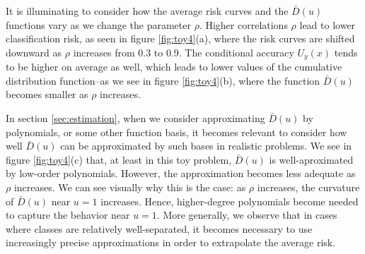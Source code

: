 \documentclass[12pt]{article}
\begin{document}
It is illuminating to consider how the average risk curves and the
$\bar{D}(u)$ functions vary as we change the parameter $\rho$.  Higher
correlations $\rho$ lead to lower classification risk, as seen in
figure \ref{fig:toy4}(a), where the risk curves are shifted downward as
$\rho$ increases from 0.3 to 0.9.  The conditional accuracy $U_y(x)$
tends to be higher on average as well, which leads to lower values of
the cumulative distribution function--as we see in
figure \ref{fig:toy4}(b), where the function $\bar{D}(u)$ becomes smaller
as $\rho$ increases.

In section \ref{sec:estimation}, when we consider approximating
$\bar{D}(u)$ by polynomials, or some other function basis, it becomes
relevant to consider how well $\bar{D}(u)$ can be approximated by such
bases in realistic problems.  We see in figure \ref{fig:toy4}(c) that,
at least in this toy problem, $\bar{D}(u)$ is well-aproximated by
low-order polynomials.  However, the approximation becomes less
adequate as $\rho$ increases.  We can see visually why this is the
case: as $\rho$ increases, the curvature of $\bar{D}(u)$ near $u = 1$
increases.  Hence, higher-degree polynomials become needed to capture
the behavior near $u = 1$.  More generally, we observe that in cases
where classes are relatively well-separated, it becomes necessary to
use increasingly precise approximations in order to extrapolate the
average risk.
\end{document}
